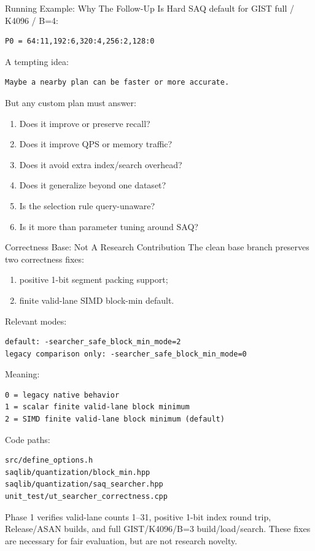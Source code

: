 \documentclass[aspectratio=169,10pt]{beamer}
\begin{document}
\begin{frame}[fragile]{Running Example: Why The Follow-Up Is Hard}
\small
SAQ default for GIST full / K4096 / B=4:
\begin{lstlisting}
P0 = 64:11,192:6,320:4,256:2,128:0
\end{lstlisting}

\vspace{0.5em}
A tempting idea:
\begin{lstlisting}
Maybe a nearby plan can be faster or more accurate.
\end{lstlisting}

\vspace{0.5em}
But any custom plan must answer:
\begin{enumerate}
  \item Does it improve or preserve recall?
  \item Does it improve QPS or memory traffic?
  \item Does it avoid extra index/search overhead?
  \item Does it generalize beyond one dataset?
  \item Is the selection rule query-unaware?
  \item Is it more than parameter tuning around SAQ?
\end{enumerate}
\end{frame}

\begin{frame}[fragile]{Correctness Base: Not A Research Contribution}
\scriptsize
The clean base branch preserves two correctness fixes:
\begin{enumerate}
  \item positive 1-bit segment packing support;
  \item finite valid-lane SIMD block-min default.
\end{enumerate}

Relevant modes:
\begin{lstlisting}
default: -searcher_safe_block_min_mode=2
legacy comparison only: -searcher_safe_block_min_mode=0
\end{lstlisting}

Meaning:
\begin{lstlisting}
0 = legacy native behavior
1 = scalar finite valid-lane block minimum
2 = SIMD finite valid-lane block minimum (default)
\end{lstlisting}

Code paths:
\begin{lstlisting}
src/define_options.h
saqlib/quantization/block_min.hpp
saqlib/quantization/saq_searcher.hpp
unit_test/ut_searcher_correctness.cpp
\end{lstlisting}

Phase 1 verifies valid-lane counts 1--31, positive 1-bit index round trip,
Release/ASAN builds, and full GIST/K4096/B=3 build/load/search. These fixes are
necessary for fair evaluation, but are not research novelty.
\end{frame}
\end{document}
